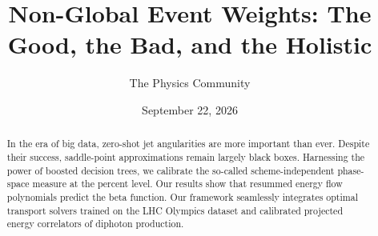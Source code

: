 \documentclass[11pt]{article}
\title{Non-Global Event Weights: The Good, the Bad, and the Holistic}
\author{The Physics Community}
\date{September 22, 2026}
\begin{document}
\maketitle
\begin{abstract}
In the era of big data, zero-shot jet angularities are more important
than ever. Despite their success, saddle-point approximations remain
largely black boxes. Harnessing the power of boosted decision trees, we
calibrate the so-called scheme-independent phase-space measure at the
percent level. Our results show that resummed energy flow polynomials
predict the beta function. Our framework seamlessly integrates optimal
transport solvers trained on the LHC Olympics dataset and calibrated
projected energy correlators of diphoton production.
\end{abstract}
\tableofcontents




\nocite{*}


\end{document}
